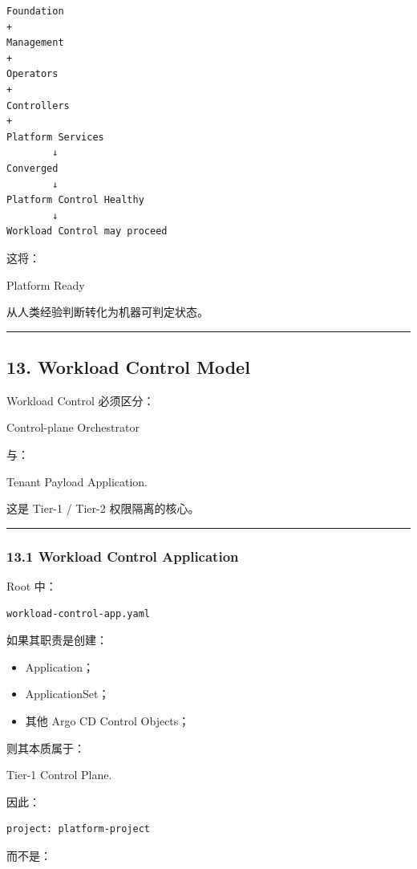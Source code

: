 \documentclass[11pt,a4paper]{article}
\begin{document}
\begin{lstlisting}[language=text]
Foundation
+
Management
+
Operators
+
Controllers
+
Platform Services
        ↓
Converged
        ↓
Platform Control Healthy
        ↓
Workload Control may proceed
\end{lstlisting}
这将：

\begin{gfmBlockquote}
Platform Ready
\end{gfmBlockquote}
从人类经验判断转化为机器可判定状态。

\vspace{0.5em}\hrule\vspace{0.5em}
\subsection{13. Workload Control Model}
Workload Control 必须区分：

\begin{gfmBlockquote}
Control-plane Orchestrator
\end{gfmBlockquote}
与：

\begin{gfmBlockquote}
Tenant Payload Application.
\end{gfmBlockquote}
这是 Tier-1 / Tier-2 权限隔离的核心。

\vspace{0.5em}\hrule\vspace{0.5em}
\subsubsection{13.1 Workload Control Application}
Root 中：

\begin{lstlisting}[language=text]
workload-control-app.yaml
\end{lstlisting}
如果其职责是创建：

\begin{itemize}
  \item Application；
  \item ApplicationSet；
  \item 其他 Argo CD Control Objects；
\end{itemize}
则其本质属于：

\begin{gfmBlockquote}
Tier-1 Control Plane.
\end{gfmBlockquote}
因此：

\begin{lstlisting}[language=text]
project: platform-project
\end{lstlisting}
而不是：
\end{document}
